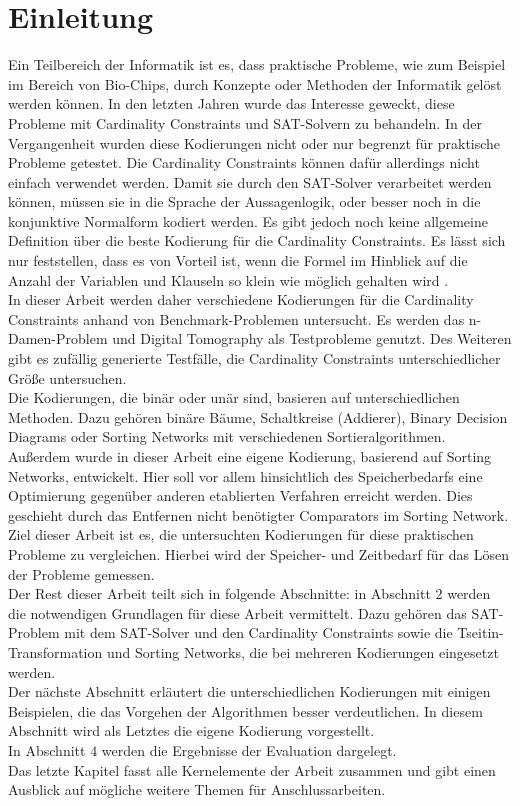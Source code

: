 \documentclass[a4,abstract=on]{scrartcl}
\newcommand*\stdsection{}
\let\stdsection\section
\renewcommand*\section{%
    \clearpage\ifodd\value{page}\else\mbox{}\clearpage\fi
    \stdsection}
\begin{document}
\section{Einleitung}
Ein Teilbereich der Informatik ist es, dass praktische Probleme, wie zum Beispiel im Bereich von Bio-Chips, durch Konzepte oder Methoden der Informatik gelöst werden können.
In den letzten Jahren wurde das Interesse geweckt, diese Probleme mit Cardinality Constraints und SAT-Solvern zu behandeln. In der Vergangenheit wurden diese Kodierungen nicht oder nur begrenzt für praktische Probleme getestet. Die Cardinality Constraints können dafür allerdings nicht einfach verwendet werden. Damit sie durch den SAT-Solver verarbeitet werden können, müssen sie in die Sprache der Aussagenlogik, oder besser noch in die konjunktive Normalform kodiert werden. Es gibt jedoch noch keine allgemeine Definition über die beste Kodierung für die Cardinality Constraints. Es lässt sich nur feststellen, dass es von Vorteil ist, wenn die Formel im Hinblick auf die Anzahl der Variablen und Klauseln so klein wie möglich gehalten wird \cite[][]{einleitung}.\\
In dieser Arbeit werden daher verschiedene Kodierungen für die Cardinality Constraints anhand von Benchmark-Problemen untersucht. Es werden das n-Damen-Problem und Digital Tomography als Testprobleme genutzt. Des Weiteren gibt es zufällig generierte Testfälle, die Cardinality Constraints unterschiedlicher Größe untersuchen. \\
Die Kodierungen, die binär oder unär sind, basieren auf unterschiedlichen Methoden. Dazu gehören binäre Bäume, Schaltkreise (Addierer), Binary Decision Diagrams oder Sorting Networks mit verschiedenen Sortieralgorithmen. \\
Außerdem wurde in dieser Arbeit eine eigene Kodierung, basierend auf Sorting Networks, entwickelt. Hier soll vor allem hinsichtlich des Speicherbedarfs eine Optimierung gegenüber anderen etablierten Verfahren erreicht werden. Dies geschieht durch das Entfernen nicht benötigter Comparators im Sorting Network. \\
Ziel dieser Arbeit ist es, die untersuchten Kodierungen für diese praktischen Probleme zu vergleichen. Hierbei wird der Speicher- und Zeitbedarf für das Lösen der Probleme gemessen. \\
\newline
Der Rest dieser Arbeit teilt sich in folgende Abschnitte: in Abschnitt $2$ werden die notwendigen Grundlagen für diese Arbeit vermittelt. Dazu gehören das SAT-Problem mit dem SAT-Solver und den Cardinality Constraints sowie die Tseitin-Transformation und Sorting Networks, die bei mehreren Kodierungen eingesetzt werden.\\
Der nächste Abschnitt erläutert die unterschiedlichen Kodierungen mit einigen Beispielen, die das Vorgehen der Algorithmen besser verdeutlichen. In diesem Abschnitt wird als Letztes die eigene Kodierung vorgestellt.\\
In Abschnitt $4$ werden die Ergebnisse der Evaluation dargelegt. \\
Das letzte Kapitel fasst alle Kernelemente der Arbeit zusammen und gibt einen Ausblick auf mögliche weitere Themen für Anschlussarbeiten.
\end{document}
